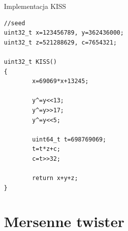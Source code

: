 \documentclass{mp}
\begin{document}
\begin{frame}[fragile]{Implementacja KISS}
\small
\begin{lstlisting}[language=C99]
//seed
uint32_t x=123456789, y=362436000;
uint32_t z=521288629, c=7654321;

uint32_t KISS()
{
        x=69069*x+13245;

        y^=y<<13;
        y^=y>>17;
        y^=y<<5;

        uint64_t t=698769069;
        t=t*z+c;
        c=t>>32;

        return x+y+z;
}
\end{lstlisting}
\end{frame}

\section{Mersenne twister}
\end{document}
